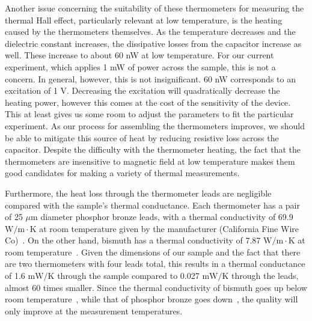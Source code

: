 \documentclass{thesis-umich}
\begin{document}
Another issue concerning the suitability of these thermometers for measuring the
thermal Hall effect, particularly relevant at low temperature, is the heating
caused by the thermometers themselves. As the temperature decreases and the
dielectric constant increases, the dissipative losses from the capacitor
increase as well. These increase to about 60 nW at low temperature. For our
current experiment, which applies 1 mW of power across the sample, this is not a
concern. In general, however, this is not insignificant. 60 nW corresponds to an
excitation of 1 V. Decreasing the excitation will quadratically decrease the
heating power, however this comes at the cost of the sensitivity of the device.
This at least gives us some room to adjust the parameters to fit the particular
experiment. As our process for assembling the thermometers improves, we should
be able to mitigate this source of heat by reducing resistive loss across the
capacitor.  Despite the difficulty with the thermometer heating, the fact that
the thermometers are insensitive to magnetic field at low temperature makes them
good candidates for making a variety of thermal measurements.

Furthermore, the heat loss through the thermometer leads are negligible compared
with the sample's thermal conductance. Each thermometer has a pair of 25 $\mu$m
diameter phosphor bronze leads, with a thermal conductivity of 69.9 $\mathrm{W/m
  \cdot K}$ at room temperature given by the manufacturer (California Fine Wire
  Co)~\cite{CFW}. On the other hand, bismuth has a thermal conductivity of 7.87
  $\mathrm{W/m\cdot K}$ at room temperature~\cite{Ekin2006}.  Given the dimensions
  of our sample and the fact that there are two thermometers with four leads
  total, this results in a thermal conductance of 1.6 $\mathrm{mW/K}$ through
  the sample compared to 0.027 $\mathrm{mW/K}$ through the leads, almost 60
  times smaller. Since the thermal conductivity of bismuth goes up below room
  temperature~\cite{White1958}, while that of phosphor bronze goes
  down~\cite{Ekin2006}, the quality will only improve at the measurement
  temperatures.
\end{document}
